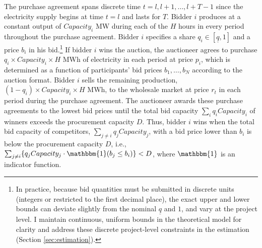 \documentclass[12pt]{article}
\theoremstyle{definition} %
\newcommand{\I}{\mathbbm{1}}
\begin{document}
The purchase agreement spans discrete time $t = l, l+1, \dots, l+T-1 $ since the electricity supply begins at time $t=l$ and lasts for $T$. Bidder $i$ produces at a constant output of $Capacity_i$ MW during each of the $H$ hours in every period throughout the purchase agreement. Bidder $i$ specifies a share $q_i \in [\underline{q},1] $ and a price $b_i $ in his bid.\footnote{In practice, because bid quantities must be submitted in discrete units (integers or restricted to the first decimal place), the exact upper and lower bounds can deviate slightly from the nominal $\underline{q}$ and $1$, and vary at the project level. I maintain continuous, uniform bounds in the theoretical model for clarity and address these discrete project-level constraints in the estimation (Section \ref{sec:estimation}).} If bidder $i$ wins the auction, the auctioneer agrees to purchase $q_i \times Capacity_i \times H $ MWh of electricity in each period at price $p_i $, which is determined as a function of participants' bid prices $b_1,\dots,b_N $ according to the auction format. Bidder $i$ sells the remaining production, $(1-q_i) \times Capacity_i \times H $ MWh, to the wholesale market at price $r_t$ in each period during the purchase agreement. The auctioneer awards these purchase agreements to the lowest bid prices until the total bid capacity $\sum_i q_i Capacity_i $ of winners exceeds the procurement capacity $D$. Thus, bidder $i$ wins when the total bid capacity of competitors, $\sum_{j \neq i} q_j Capacity_j $, with a bid price lower than $b_i$ is below the procurement capacity $D$, i.e., $\sum_{j \neq i} \{ q_j Capacity_j \cdot \I(b_j \leq b_i) \} < D $, where $\I $ is an indicator function.
\end{document}
